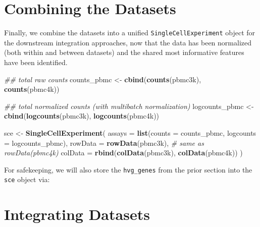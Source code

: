 \documentclass[]{book}
\newenvironment{Shaded}{\begin{snugshade}}{\end{snugshade}}
\newcommand{\CommentTok}[1]{\textcolor[rgb]{0.56,0.35,0.01}{\textit{#1}}}
\newcommand{\DataTypeTok}[1]{\textcolor[rgb]{0.13,0.29,0.53}{#1}}
\newcommand{\KeywordTok}[1]{\textcolor[rgb]{0.13,0.29,0.53}{\textbf{#1}}}
\newcommand{\NormalTok}[1]{#1}
\newcommand{\OperatorTok}[1]{\textcolor[rgb]{0.81,0.36,0.00}{\textbf{#1}}}
\newcommand{\StringTok}[1]{\textcolor[rgb]{0.31,0.60,0.02}{#1}}
\begin{document}
\hypertarget{combining-the-datasets}{%
\section{Combining the Datasets}\label{combining-the-datasets}}

Finally, we combine the datasets into a unified \texttt{SingleCellExperiment} object for the downstream integration approaches, now that the data has been normalized (both within and between datasets) and the shared most informative features have been identified.

\begin{Shaded}
\begin{Highlighting}[]
\CommentTok{## total raw counts}
\NormalTok{counts_pbmc <-}\StringTok{ }\KeywordTok{cbind}\NormalTok{(}\KeywordTok{counts}\NormalTok{(pbmc3k), }\KeywordTok{counts}\NormalTok{(pbmc4k))}

\CommentTok{## total normalized counts (with multibatch normalization)}
\NormalTok{logcounts_pbmc <-}\StringTok{ }\KeywordTok{cbind}\NormalTok{(}\KeywordTok{logcounts}\NormalTok{(pbmc3k), }\KeywordTok{logcounts}\NormalTok{(pbmc4k))}

\NormalTok{sce <-}\StringTok{ }\KeywordTok{SingleCellExperiment}\NormalTok{( }
    \DataTypeTok{assays =} \KeywordTok{list}\NormalTok{(}\DataTypeTok{counts =}\NormalTok{ counts_pbmc, }\DataTypeTok{logcounts =}\NormalTok{ logcounts_pbmc),  }
    \DataTypeTok{rowData =} \KeywordTok{rowData}\NormalTok{(pbmc3k), }\CommentTok{# same as rowData(pbmc4k) }
    \DataTypeTok{colData =} \KeywordTok{rbind}\NormalTok{(}\KeywordTok{colData}\NormalTok{(pbmc3k), }\KeywordTok{colData}\NormalTok{(pbmc4k)) }
\NormalTok{) }
\end{Highlighting}
\end{Shaded}

For safekeeping, we will also store the \texttt{hvg\_genes} from the prior section into the \texttt{sce} object via:

\begin{Shaded}
\end{Shaded}

\hypertarget{integrating-datasets}{%
\section{Integrating Datasets}\label{integrating-datasets}}
\end{document}
